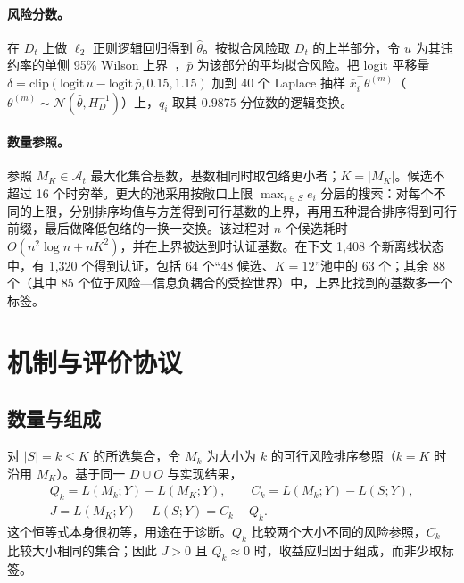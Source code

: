 \documentclass[runningheads]{llncs}
\begin{document}
\paragraph{风险分数。}在 $D_t$ 上做 $\ell_2$ 正则逻辑回归得到 $\widehat\theta$。按拟合风险取 $D_t$ 的上半部分，令 $u$ 为其违约率的单侧 95\% Wilson 上界~\cite{wilson1927probable}，$\bar p$ 为该部分的平均拟合风险。把 logit 平移量 $\delta=\mathrm{clip}(\mathrm{logit}\,u-\mathrm{logit}\,\bar p,0.15,1.15)$ 加到 40 个 Laplace 抽样 $\bar x_i^\top\theta^{(m)}$（$\theta^{(m)}\sim\mathcal N(\widehat\theta,H_D^{-1})$）上，$q_i$ 取其 $0.9875$ 分位数的逻辑变换。

\paragraph{数量参照。}参照 $M_K\in\mathcal A_t$ 最大化集合基数，基数相同时取包络更小者；$K=|M_K|$。候选不超过 16 个时穷举。更大的池采用按敞口上限 $\max_{i\in S}e_i$ 分层的搜索：对每个不同的上限，分别排序均值与方差得到可行基数的上界，再用五种混合排序得到可行前缀，最后做降低包络的一换一交换。该过程对 $n$ 个候选耗时 $O(n^2\log n+nK^2)$，并在上界被达到时认证基数。在下文 1{,}408 个新离线状态中，有 1{,}320 个得到认证，包括 64 个“48 候选、$K=12$”池中的 63 个；其余 88 个（其中 85 个位于风险—信息负耦合的受控世界）中，上界比找到的基数多一个标签。

\section{机制与评价协议}
\label{sec:mechanism}
\subsection{数量与组成}
对 $|S|=k\le K$ 的所选集合，令 $M_k$ 为大小为 $k$ 的可行风险排序参照（$k=K$ 时沿用 $M_K$）。基于同一 $D\cup O$ 与实现结果，
\begin{equation}
\begin{gathered}
 Q_k=L(M_k;Y)-L(M_K;Y),\qquad C_k=L(M_k;Y)-L(S;Y),\\
 J=L(M_K;Y)-L(S;Y)=C_k-Q_k.
\end{gathered}
 \label{eq:decomposition}
\end{equation}
这个恒等式本身很初等，用途在于诊断。$Q_k$ 比较两个大小不同的风险参照，$C_k$ 比较大小相同的集合；因此 $J>0$ 且 $Q_k\approx0$ 时，收益应归因于组成，而非少取标签。
\end{document}
